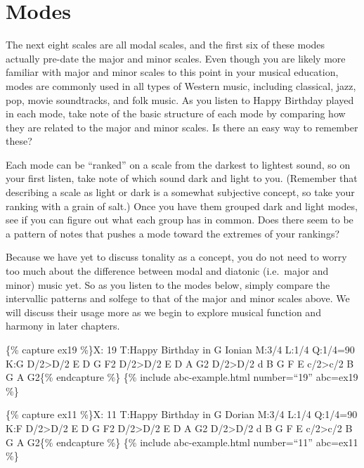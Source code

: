 \documentclass{book}
\begin{document}
\hypertarget{modes}{%
\section{Modes}\label{modes}}

The next eight scales are all modal scales, and the first six of these modes
actually pre-date the major and minor scales. Even though you are likely more
familiar with major and minor scales to this point in your musical education,
modes are commonly used in all types of Western music, including classical,
jazz, pop, movie soundtracks, and folk music. As you listen to Happy Birthday
played in each mode, take note of the basic structure of each mode by
comparing how they are related to the major and minor scales. Is there an easy
way to remember these?

Each mode can be ``ranked'' on a scale from the darkest to lightest sound, so
on your first listen, take note of which sound dark and light to you.
(Remember that describing a scale as light or dark is a somewhat subjective
concept, so take your ranking with a grain of salt.) Once you have them
grouped dark and light modes, see if you can figure out what each group has in
common. Does there seem to be a pattern of notes that pushes a mode toward the
extremes of your rankings?

Because we have yet to discuss tonality as a concept, you do not need to worry
too much about the difference between modal and diatonic (i.e.~major and
minor) music yet. So as you listen to the modes below, simply compare the
intervallic patterns and solfege to that of the major and minor scales above.
We will discuss their usage more as we begin to explore musical function and
harmony in later chapters.

\{\% capture ex19 \%\}X: 19 T:Happy Birthday in G Ionian M:3/4 L:1/4 Q:1/4=90
K:G D/2\textgreater D/2\textbar{} E D G\textbar{} F2
D/2\textgreater D/2\textbar{} E D A\textbar{} G2 D/2\textgreater D/2\textbar{}
d B G\textbar{} F E c/2\textgreater c/2\textbar{} B G A\textbar{}
G2\textbar{]}\{\% endcapture \%\} \{\% include abc-example.html number=``19''
abc=ex19 \%\}

\{\% capture ex11 \%\}X: 11 T:Happy Birthday in G Dorian M:3/4 L:1/4 Q:1/4=90
K:F D/2\textgreater D/2\textbar{} E D G\textbar{} F2
D/2\textgreater D/2\textbar{} E D A\textbar{} G2 D/2\textgreater D/2\textbar{}
d B G\textbar{} F E c/2\textgreater c/2\textbar{} B G A\textbar{}
G2\textbar{]}\{\% endcapture \%\} \{\% include abc-example.html number=``11''
abc=ex11 \%\}
\end{document}

